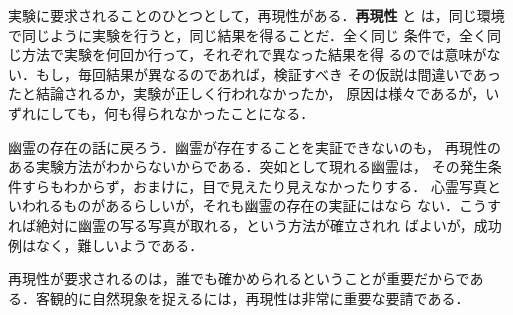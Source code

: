            実験に要求されることのひとつとして，再現性がある．\textbf{再現性} と
            は，同じ環境で同じように実験を行うと，同じ結果を得ることだ．全く同じ
            条件で，全く同じ方法で実験を何回か行って，それぞれで異なった結果を得
            るのでは意味がない．もし，毎回結果が異なるのであれば，検証すべき
            その仮説は間違いであったと結論されるか，実験が正しく行われなかったか，
            原因は様々であるが，いずれにしても，何も得られなかったことになる．

            幽霊の存在の話に戻ろう．幽霊が存在することを実証できないのも，
            再現性のある実験方法がわからないからである．突如として現れる幽霊は，
            その発生条件すらもわからず，おまけに，目で見えたり見えなかったりする．
            心霊写真といわれるものがあるらしいが，それも幽霊の存在の実証にはなら
            ない．こうすれば絶対に幽霊の写る写真が取れる，という方法が確立されれ
            ばよいが，成功例はなく，難しいようである．

            再現性が要求されるのは，誰でも確かめられるということが重要だからであ
            る．客観的に自然現象を捉えるには，再現性は非常に重要な要請である．

